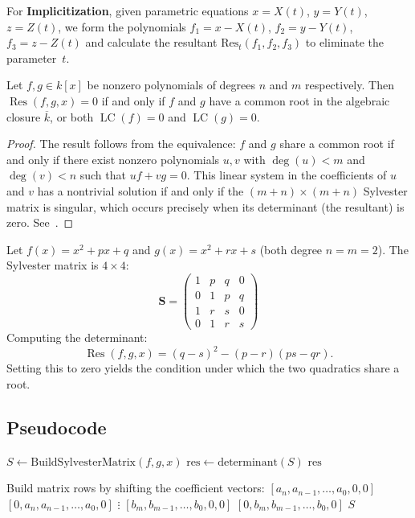 For \textbf{Implicitization}, given parametric equations $x = X(t)$, $y = Y(t)$, $z = Z(t)$, we form the polynomials $f_1 = x - X(t)$, $f_2 = y - Y(t)$, $f_3 = z - Z(t)$ and calculate the resultant $\text{Res}_t(f_1, f_2, f_3)$ to eliminate the parameter~$t$.

\begin{theorem}\label{thm:resultant}
Let $f, g \in k[x]$ be nonzero polynomials of degrees $n$ and $m$ respectively. Then $\operatorname{Res}(f, g, x) = 0$ if and only if $f$ and $g$ have a common root in the algebraic closure $\overline{k}$, or both $\operatorname{LC}(f) = 0$ and $\operatorname{LC}(g) = 0$.
\end{theorem}

\begin{proof}
The result follows from the equivalence: $f$ and $g$ share a common root if and only if there exist nonzero polynomials $u, v$ with $\deg(u) < m$ and $\deg(v) < n$ such that $u f + v g = 0$. This linear system in the coefficients of $u$ and $v$ has a nontrivial solution if and only if the $(m+n) \times (m+n)$ Sylvester matrix is singular, which occurs precisely when its determinant (the resultant) is zero. See~\cite[Chapter~3]{cox2007}.
\end{proof}

\begin{example}\label{ex:resultant_quadratic}
Let $f(x) = x^2 + px + q$ and $g(x) = x^2 + rx + s$ (both degree $n = m = 2$). The Sylvester matrix is $4 \times 4$:
\[
\mathbf{S} = \begin{pmatrix}
1 & p & q & 0 \\
0 & 1 & p & q \\
1 & r & s & 0 \\
0 & 1 & r & s
\end{pmatrix}
\]
Computing the determinant:
\[
\operatorname{Res}(f, g, x) = (q - s)^2 - (p - r)(ps - qr).
\]
Setting this to zero yields the condition under which the two quadratics share a root.
\end{example}

\subsection{Pseudocode}
\begin{algorithm}[ht]
\label{alg:resultant}
\begin{algorithmic}[1]
    \State $S \gets \text{BuildSylvesterMatrix}(f, g, x)$
    \State $\text{res} \gets \text{determinant}(S)$
    \State \Return $\text{res}$
\EndFunction

    \State Build matrix rows by shifting the coefficient vectors:
    \State $[a_n, a_{n-1}, \ldots, a_0, 0, 0]$
    \State $[0, a_n, a_{n-1}, \ldots, a_0, 0]$
    \State $\vdots$
    \State $[b_m, b_{m-1}, \ldots, b_0, 0, 0]$
    \State $[0, b_m, b_{m-1}, \ldots, b_0, 0]$
    \State \Return $S$
\EndFunction
\end{algorithmic}
\end{algorithm}

